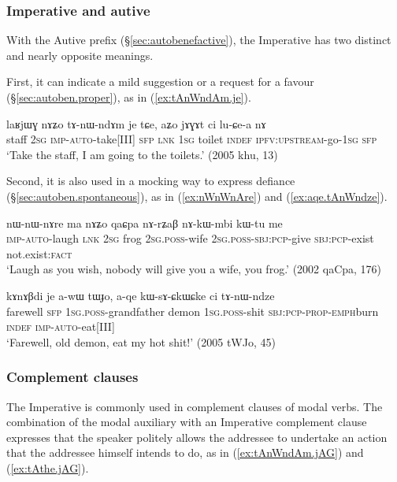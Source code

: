 \subsubsection{Imperative and autive} \label{sec:imp.autive}
With the Autive prefix (§\ref{sec:autobenefactive}), the Imperative has two distinct and nearly opposite meanings. 

First, it can indicate a mild suggestion or a request for a favour (§\ref{sec:autoben.proper}), as in (\ref{ex:tAnWndAm.je}).

\begin{exe}
\ex \label{ex:tAnWndAm.je}
\gll laʁjɯɣ nɤʑo tɤ-nɯ-ndɤm je tɕe, aʑo jɤɣɤt ci lu-ɕe-a nɤ \\
staff \textsc{2sg} \textsc{imp}-\textsc{auto}-take[III] \textsc{sfp} \textsc{lnk} \textsc{1sg} toilet \textsc{indef} \textsc{ipfv}:\textsc{upstream}-go-\textsc{1sg} \textsc{sfp} \\
\glt `Take the staff, I am going to the toilets.' (2005 khu, 13)
\end{exe}

Second, it is also used in a mocking way to express defiance (§\ref{sec:autoben.spontaneous}), as in (\ref{ex:nWnWnAre}) and (\ref{ex:aqe.tAnWndze}).

\begin{exe}
\ex  \label{ex:nWnWnAre}
\gll  nɯ-nɯ-nɤre ma nɤʑo qaɕpa nɤ-rʑaβ nɤ-kɯ-mbi kɯ-tu me   \\
\textsc{imp}-\textsc{auto}-laugh \textsc{lnk} \textsc{2sg} frog \textsc{2sg}.\textsc{poss}-wife \textsc{2sg}.\textsc{poss}-\textsc{sbj}:\textsc{pcp}-give \textsc{sbj}:\textsc{pcp}-exist not.exist:\textsc{fact} \\
\glt `Laugh as you wish, nobody will give you a wife, you frog.'   (2002 qaCpa, 176)
\end{exe} 

\begin{exe}
\ex  \label{ex:aqe.tAnWndze}
\gll kɤnɤβdi je a-wɯ tɯɟo, a-qe kɯ-sɤ-ɕkɯ\redp{}ɕke ci tɤ-nɯ-ndze \\
farewell \textsc{sfp} \textsc{1sg}.\textsc{poss}-grandfather demon \textsc{1sg}.\textsc{poss}-shit \textsc{sbj}:\textsc{pcp}-\textsc{prop}-\textsc{emph}\redp{}burn \textsc{indef} \textsc{imp}-\textsc{auto}-eat[III] \\
\glt `Farewell, old demon, eat my hot shit!' (2005 tWJo, 45)
\end{exe}

\subsubsection{Complement clauses} \label{sec:imp.compl}
The Imperative is commonly used in complement clauses of modal verbs. The combination of the modal auxiliary  with an Imperative complement clause expresses that the speaker politely allows the addressee to undertake an action that the addressee himself intends to do, as in (\ref{ex:tAnWndAm.jAG}) and (\ref{ex:tAthe.jAG}).


